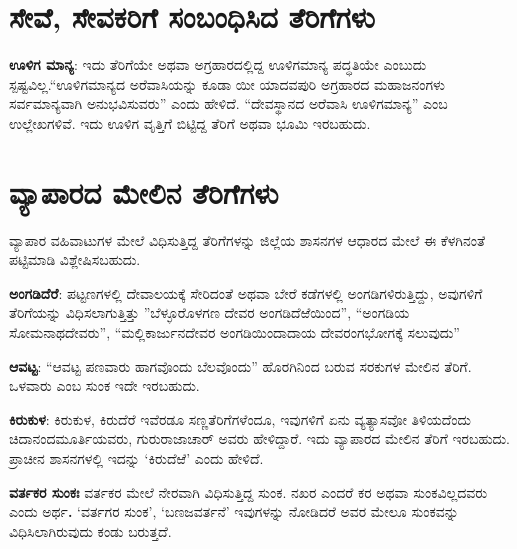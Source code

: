 \section{ಸೇವೆ, ಸೇವಕರಿಗೆ ಸಂಬಂಧಿಸಿದ ತೆರಿಗೆಗಳು}

\textbf{ಊಳಿಗ ಮಾನ್ಯ}: ಇದು ತೆರಿಗೆಯೇ ಅಥವಾ ಅಗ್ರಹಾರದಲ್ಲಿದ್ದ ಊಳಿಗಮಾನ್ಯ ಪದ್ಧತಿಯೇ ಎಂಬುದು ಸ್ಪಷ್ಟವಿಲ್ಲ.\break “ಊಳಿಗಮಾನ್ಯದ ಅರೆವಾಸಿಯನ್ನು ಕೂಡಾ ಯೀ ಯಾದವಪುರಿ ಅಗ್ರಹಾರದ ಮಹಾಜನಂಗಳು ಸರ್ವಮಾನ್ಯವಾಗಿ ಅನುಭವಿಸುವರು” ಎಂದು ಹೇಳಿದೆ. “ದೇವಸ್ಥಾನದ ಅರೆವಾಸಿ ಊಳಿಗಮಾನ್ಯ” ಎಂಬ ಉಲ್ಲೇಖಗಳಿವೆ. ಇದು ಊಳಿಗ ವೃತ್ತಿಗೆ ಬಿಟ್ಟಿದ್ದ ತೆರಿಗೆ ಅಥವಾ ಭೂಮಿ ಇರಬಹುದು.


\section{ವ್ಯಾಪಾರದ ಮೇಲಿನ ತೆರಿಗೆಗಳು}

ವ್ಯಾಪಾರ ವಹಿವಾಟುಗಳ ಮೇಲೆ ವಿಧಿಸುತ್ತಿದ್ದ ತೆರಿಗೆಗಳನ್ನು ಜಿಲ್ಲೆಯ ಶಾಸನಗಳ ಆಧಾರದ ಮೇಲೆ ಈ ಕೆಳಗಿನಂತೆ ಪಟ್ಟಿಮಾಡಿ ವಿಶ್ಲೇಷಿಸಬಹುದು.

\textbf{ಅಂಗಡಿದೆರೆ}: ಪಟ್ಟಣಗಳಲ್ಲಿ ದೇವಾಲಯಕ್ಕೆ ಸೇರಿದಂತೆ ಅಥವಾ ಬೇರೆ ಕಡೆಗಳಲ್ಲಿ ಅಂಗಡಿಗಳಿರುತ್ತಿದ್ದು, ಅವುಗಳಿಗೆ ತೆರಿಗೆಯನ್ನು ವಿಧಿಸಲಾಗುತ್ತಿತ್ತು ”ಬೆಳ್ಳೂರೊಳಗಣ ದೇವರ ಅಂಗಡಿದೆಱೆಯಿಂದ”, “ಅಂಗಡಿಯ ಸೋಮನಾಥದೇವರು”, “ಮಲ್ಲಿಕಾರ್ಜುನದೇವರ ಅಂಗಡಿಯಿಂದಾದಾಯ ದೇವರಂಗಭೋಗಕ್ಕೆ ಸಲುವುದು”

\textbf{ಆವಟ್ಟ}: “ಆವಟ್ಟ ಪಣವಾರು ಹಾಗವೊಂದು ಬೆಲವೊಂದು” ಹೊರಗಿನಿಂದ ಬರುವ ಸರಕುಗಳ ಮೇಲಿನ ತೆರಿಗೆ. ಒಳವಾರು ಎಂಬ ಸುಂಕ ಇದೇ ಇರಬಹುದು.

\textbf{ಕಿರುಕುಳ}: ಕಿರುಕುಳ, ಕಿರುದೆರೆ ಇವೆರಡೂ ಸಣ್ಣತೆರಿಗೆಗಳೆಂದೂ, ಇವುಗಳಿಗೆ ಏನು ವ್ಯತ್ಯಾಸವೋ ತಿಳಿಯದೆಂದು ಚಿದಾನಂದಮೂರ್ತಿಯವರು, ಗುರುರಾಜಾಚಾರ್​ ಅವರು ಹೇಳಿದ್ದಾರೆ. ಇದು ವ್ಯಾಪಾರದ ಮೇಲಿನ ತೆರಿಗೆ ಇರಬಹುದು. ಪ್ರಾಚೀನ ಶಾಸನಗಳಲ್ಲಿ ಇದನ್ನು ‘ಕಿರುದೆಱೆ’ ಎಂದು ಹೇಳಿದೆ.

\textbf{ವರ್ತಕರ ಸುಂಕಃ } ವರ್ತಕರ ಮೇಲೆ ನೇರವಾಗಿ ವಿಧಿಸುತ್ತಿದ್ದ ಸುಂಕ. ನಖರ ಎಂದರೆ ಕರ ಅಥವಾ ಸುಂಕವಿಲ್ಲದವರು ಎಂದು ಅರ್ಥ\textbf{. }‘ವರ್ತಗರ ಸುಂಕ’, ‘ಬಣಜವರ್ತನೆ’ ಇವುಗಳನ್ನು ನೋಡಿದರೆ ಅವರ ಮೇಲೂ ಸುಂಕವನ್ನು ವಿಧಿಸಿಲಾಗಿರುವುದು ಕಂಡು ಬರುತ್ತದೆ.

